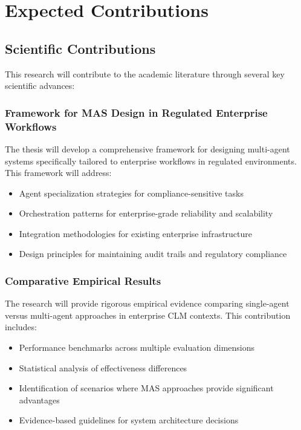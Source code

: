 
\chapter{Expected Contributions}\label{chapter:expected_contributions}

\section{Scientific Contributions}

This research will contribute to the academic literature through several key scientific advances:

\subsection{Framework for MAS Design in Regulated Enterprise Workflows}
The thesis will develop a comprehensive framework for designing multi-agent systems specifically tailored to enterprise workflows in regulated environments. This framework will address:
\begin{itemize}
    \item Agent specialization strategies for compliance-sensitive tasks
    \item Orchestration patterns for enterprise-grade reliability and scalability
    \item Integration methodologies for existing enterprise infrastructure
    \item Design principles for maintaining audit trails and regulatory compliance
\end{itemize}

\subsection{Comparative Empirical Results}
The research will provide rigorous empirical evidence comparing single-agent versus multi-agent approaches in enterprise CLM contexts. This contribution includes:
\begin{itemize}
    \item Performance benchmarks across multiple evaluation dimensions
    \item Statistical analysis of effectiveness differences
    \item Identification of scenarios where MAS approaches provide significant advantages
    \item Evidence-based guidelines for system architecture decisions
\end{itemize}


